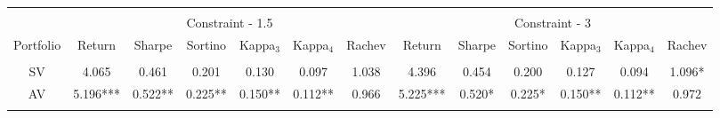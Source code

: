 \begin{tabular}{@{\extracolsep{5pt}} ccccccccccccc} 
\hline \\[-1.8ex] 
& \multicolumn{6}{c}{Constraint - 1.5} &\multicolumn{6}{c}{Constraint - 3}\\
\cline{2-7} \cline{8-13}
Portfolio & Return & Sharpe & Sortino & Kappa$_{3}$ & Kappa$_{4}$ & Rachev & Return & Sharpe & Sortino & Kappa$_{3}$ & Kappa$_{4}$ & Rachev \\ 
\hline \\[-1.8ex] 
SV & 4.065 & 0.461 & 0.201 & 0.130 & 0.097 & 1.038 & 4.396 & 0.454 & 0.200 & 0.127 & 0.094 & 1.096* \\ 
AV & 5.196*** & 0.522** & 0.225** & 0.150** & 0.112** & 0.966 & 5.225*** & 0.520* & 0.225* & 0.150** & 0.112** & 0.972 \\ 
\hline\\
\end{tabular}